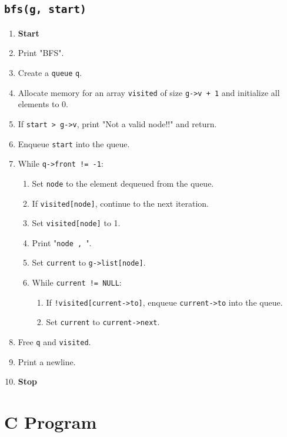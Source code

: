 {  \subsection{\texttt{bfs(g, start)}}
  \begin{enumerate}[label=\arabic*:,left=0pt]
    \item \textbf{Start}
    \item Print "BFS".
    \item Create a \texttt{queue} \texttt{q}.
    \item Allocate memory for an array \texttt{visited} of size \texttt{g->v + 1} and initialize all elements to 0.
    \item If \texttt{start > g->v}, print "Not a valid node!!" and return.
    \item Enqueue \texttt{start} into the queue.
    \item While \texttt{q->front != -1}:
          \begin{enumerate}[label=7.\arabic*:, start=1]
            \item Set \texttt{node} to the element dequeued from the queue.
            \item If \texttt{visited[node]}, continue to the next iteration.
            \item Set \texttt{visited[node]} to 1.
            \item Print "\texttt{node , }".
            \item Set \texttt{current} to \texttt{g->list[node]}.
            \item While \texttt{current != NULL}:
                  \begin{enumerate}[label=7.5.\arabic*:, start=1]
                    \item If \texttt{!visited[current->to]}, enqueue \texttt{current->to} into the queue.
                    \item Set \texttt{current} to \texttt{current->next}.
                  \end{enumerate}
          \end{enumerate}
    \item Free \texttt{q} and \texttt{visited}.
    \item Print a newline.
    \item \textbf{Stop}
  \end{enumerate}
 }

\section{C Program}

